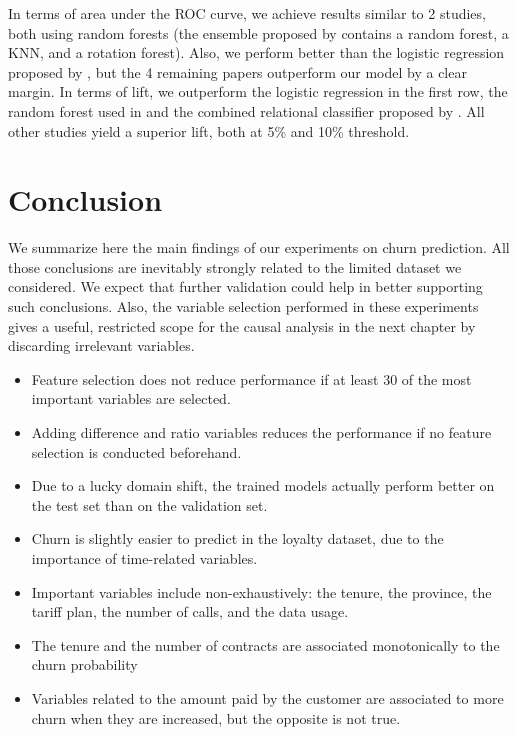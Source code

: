 In terms of area under the ROC curve, we achieve results similar to 2 studies,
both using random forests (the ensemble proposed by \textcite{idris2014ensemble}
contains a random forest, a KNN, and a rotation forest). Also, we perform better
than the logistic regression proposed by \textcite{coussement2017comparative},
but the 4 remaining papers outperform our model by a clear margin. In terms of
lift, we outperform the logistic regression in the first row, the random forest
used in \textcite{mitrovic2018operational} and the combined relational
classifier proposed by \textcite{verbeke2014social}. All other studies yield a
superior lift, both at 5\% and 10\% threshold.

\section{Conclusion}

We summarize here the main findings of our experiments on churn prediction. All
those conclusions are inevitably strongly related to the limited dataset we
considered. We expect that further validation could help in better supporting
such conclusions. Also, the variable selection performed in these experiments
gives a useful, restricted scope for the causal analysis in the next chapter by
discarding irrelevant variables.

\begin{itemize}
    \item Feature selection does not reduce performance if at least 30 of the
    most important variables are selected.
    \item Adding difference and ratio variables reduces the performance if no
    feature selection is conducted beforehand.
    \item Due to a lucky domain shift, the trained models actually perform
    better on the test set than on the validation set.
    \item Churn is slightly easier to predict in the loyalty dataset, due to
    the importance of time-related variables.
    \item Important variables include non-exhaustively: the tenure, the
    province, the tariff plan, the number of calls, and the data usage.
    \item The tenure and the number of contracts are associated monotonically to
    the churn probability
    \item Variables related to the amount paid by the customer are associated to
    more churn when they are increased, but the opposite is not true.
\end{itemize}

